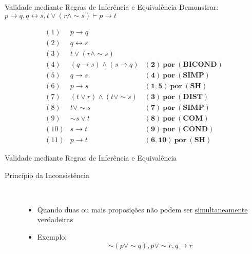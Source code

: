 \begin{frame}[t]{Validade mediante Regras de Inferência e Equivalência}
	Demonstrar: $p \rightarrow q, q \leftrightarrow s, t \vee (r \wedge\sim s) \vdash p \rightarrow t$
	
	\vskip 0.5cm
	
	$$\begin{array}{lll}
	(1) & p \rightarrow q & \\
	(2) & q \leftrightarrow s & \\
	(3) & t \vee (r \wedge\sim s) & \\
	\hline
	(4) & (q \rightarrow s) \wedge (s \rightarrow q) & \mathbf{(2)~por~(BICOND)} \\
	(5) & q \rightarrow s & \mathbf{(4)~por~(SIMP)} \\
	(6) & p \rightarrow s & \mathbf{(1,5)~por~(SH)} \\
	(7) & (t \vee r) \wedge (t \vee\sim s) & \mathbf{(3)~por~(DIST)} \\
	(8) & t \vee\sim s & \mathbf{(7)~por~(SIMP)} \\
	(9) & \sim s \vee t & \mathbf{(8)~por~(COM)} \\
	(10) & s \rightarrow t & \mathbf{(9)~por~(COND)} \\
	(11) & p \rightarrow t & \mathbf{(6,10)~por~(SH)}
	\end{array}$$	
\end{frame}


\begin{frame}[t]{Validade mediante Regras de Inferência e Equivalência}
	\begin{description}
	\item[Princípio da Inconsistência] ~~
	\begin{itemize}
	\item Quando duas ou mais proposições não podem ser \underline{simultaneamente} verdadeiras
	\item Exemplo: $$\sim (p \vee\sim q), p \vee\sim r, q \rightarrow r$$ 
	\end{itemize}
	\end{description}
\end{frame}


